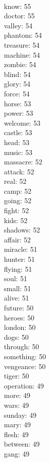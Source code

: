 \begin{multicols}{6}
  \\ know: 55
  \\ doctor: 55
  \\ valley: 54
  \\ phantom: 54
  \\ treasure: 54
  \\ machine: 54
  \\ zombie: 54
  \\ blind: 54
  \\ glory: 54
  \\ force: 54
  \\ horse: 53
  \\ power: 53
  \\ welcome: 53
  \\ castle: 53
  \\ head: 53
  \\ music: 53
  \\ massacre: 52
  \\ attack: 52
  \\ real: 52
  \\ camp: 52
  \\ going: 52
  \\ fight: 52
  \\ kids: 52
  \\ shadows: 52
  \\ affair: 52
  \\ miracle: 51
  \\ hunter: 51
  \\ flying: 51
  \\ soul: 51
  \\ small: 51
  \\ alive: 51
  \\ future: 50
  \\ heroes: 50
  \\ london: 50
  \\ dogs: 50
  \\ through: 50
  \\ something: 50
  \\ vengeance: 50
  \\ tiger: 50
  \\ operation: 49
  \\ more: 49
  \\ wars: 49
  \\ sunday: 49
  \\ mary: 49
  \\ flesh: 49
  \\ between: 49
  \\ gang: 49

\end{multicols}
